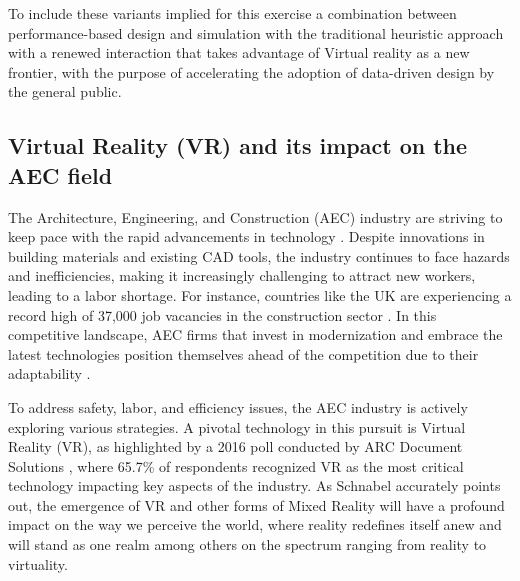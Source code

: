 To include these variants implied for this exercise a combination between performance-based design and simulation with the traditional heuristic approach with a renewed interaction that takes advantage of Virtual reality as a new frontier, with the purpose of accelerating the adoption of data-driven design by the general public. 

\subsection{Virtual Reality (VR) and its impact on the AEC field}
\label{subsec:VR and AEC}

The Architecture, Engineering, and Construction (AEC) industry are striving to keep pace with the rapid advancements in technology \cite{Moonhubwebsite}. Despite innovations in building materials and existing CAD tools, the industry continues to face hazards and inefficiencies, making it increasingly challenging to attract new workers, leading to a labor shortage. For instance, countries like the UK are experiencing a record high of 37,000 job vacancies in the construction sector \cite{ConstructionVacancies}. In this competitive landscape, AEC firms that invest in modernization and embrace the latest technologies position themselves ahead of the competition due to their adaptability \cite{Alizadehsalehi2020}.


To address safety, labor, and efficiency issues, the AEC industry is actively exploring various strategies. A pivotal technology in this pursuit is Virtual Reality (VR), as highlighted by a 2016 poll conducted by ARC Document Solutions \cite{ARCdocument}, where 65.7\% of respondents recognized VR as the most critical technology impacting key aspects of the industry. As Schnabel \cite{Schnabel2009} accurately points out, the emergence of VR and other forms of Mixed Reality will have a profound impact on the way we perceive the world, where reality redefines itself anew and will stand as one realm among others on the spectrum ranging from reality to virtuality. 
        
